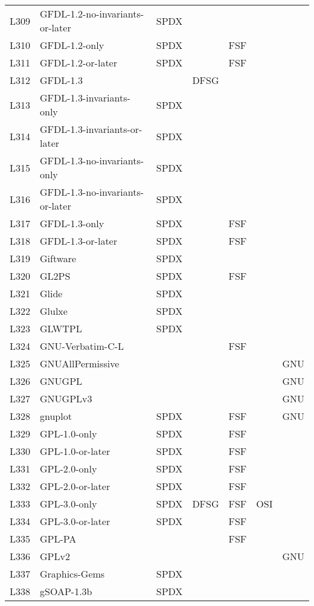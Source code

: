 \begin{longtable}[h]{m{2cm} | m{7cm} | c | c | c | c | c}
  L309 & GFDL-1.2-no-invariants-or-later & SPDX &  &  &  &  \\
  L310 & GFDL-1.2-only & SPDX &  & FSF &  &  \\
  L311 & GFDL-1.2-or-later & SPDX &  & FSF &  &  \\
  L312 & GFDL-1.3 &  & DFSG &  &  &  \\
  L313 & GFDL-1.3-invariants-only & SPDX &  &  &  &  \\
  L314 & GFDL-1.3-invariants-or-later & SPDX &  &  &  &  \\
  L315 & GFDL-1.3-no-invariants-only & SPDX &  &  &  &  \\
  L316 & GFDL-1.3-no-invariants-or-later & SPDX &  &  &  &  \\
  L317 & GFDL-1.3-only & SPDX &  & FSF &  &  \\
  L318 & GFDL-1.3-or-later & SPDX &  & FSF &  &  \\
  L319 & Giftware & SPDX &  &  &  &  \\
  L320 & GL2PS & SPDX &  & FSF &  &  \\
  L321 & Glide & SPDX &  &  &  &  \\
  L322 & Glulxe & SPDX &  &  &  &  \\
  L323 & GLWTPL & SPDX &  &  &  &  \\
  L324 & GNU-Verbatim-C-L &  &  & FSF &  &  \\
  L325 & GNUAllPermissive &  &  &  &  & GNU \\
  L326 & GNUGPL &  &  &  &  & GNU \\
  L327 & GNUGPLv3 &  &  &  &  & GNU \\
  L328 & gnuplot & SPDX &  & FSF &  & GNU \\
  L329 & GPL-1.0-only & SPDX &  & FSF &  &  \\
  L330 & GPL-1.0-or-later & SPDX &  & FSF &  &  \\
  L331 & GPL-2.0-only & SPDX &  & FSF &  &  \\
  L332 & GPL-2.0-or-later & SPDX &  & FSF &  &  \\
  L333 & GPL-3.0-only & SPDX & DFSG & FSF & OSI &  \\
  L334 & GPL-3.0-or-later & SPDX &  & FSF &  &  \\
  L335 & GPL-PA &  &  & FSF &  &  \\
  L336 & GPLv2 &  &  &  &  & GNU \\
  L337 & Graphics-Gems & SPDX &  &  &  &  \\
  L338 & gSOAP-1.3b & SPDX &  &  &  &  \\

\end{longtable}
